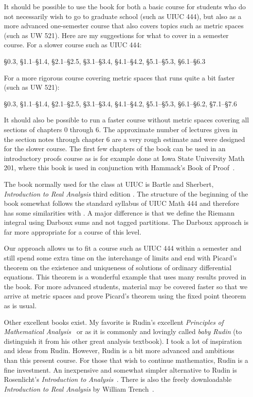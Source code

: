 \documentclass[12pt]{book}
\begin{document}
It should be possible to use the book for both a basic course for students who do not necessarily wish to go to graduate school (such as UIUC 444), but also as a more advanced one-semester course that also covers topics such as metric spaces (such as UW 521).
Here are my suggestions for what to cover in a semester course.
 For a slower course such as UIUC 444:
\begin{center}
\S0.3, \S1.1--\S1.4, \S2.1--\S2.5, \S3.1--\S3.4, \S4.1--\S4.2,
\S5.1--\S5.3, \S6.1--\S6.3
\end{center}
For a more rigorous course covering metric spaces that runs quite a bit faster (such as UW 521):
\begin{center}
\S0.3, \S1.1--\S1.4, \S2.1--\S2.5, \S3.1--\S3.4, \S4.1--\S4.2,
\S5.1--\S5.3, \S6.1--\S6.2, \S7.1--\S7.6
\end{center}
It should also be possible to run a faster course without metric spaces covering all sections of chapters 0 through 6.
 The approximate number of
lectures given in the section notes through chapter 6 are a very rough estimate and were designed for the slower course.
The first few chapters of the book can be used in an introductory proofs course as is for example done at Iowa State University Math 201, where  this book is used in conjunction with Hammack's Book of Proof~\cite{Hammack}.

The book normally used for the class at UIUC is Bartle and Sherbert,
\emph{Introduction to Real Analysis} third edition \cite{BS}.
The structure of the beginning of the book somewhat follows the standard syllabus of UIUC Math 444 and therefore has some similarities with \cite{BS}.
A major difference is that we define the Riemann integral using Darboux sums and not tagged partitions.
 The Darboux approach is far more appropriate for a course of this level.

Our approach allows us to fit a course such as UIUC 444 within a semester and still spend some extra time on the interchange of limits and end with Picard's theorem on the existence and uniqueness of solutions of ordinary differential equations.
This theorem is a wonderful example that uses many results proved in the book.
 For more advanced students,
material may be covered faster so that we arrive at metric spaces and prove Picard's theorem using the fixed point theorem as is usual.

Other excellent books exist.
 My favorite is  Rudin's excellent \emph{Principles of Mathematical Analysis}~\cite{Rudin:baby} or as it is commonly and lovingly called \emph{baby Rudin} (to distinguish it from his other great analysis textbook).  
 I took a lot of inspiration and ideas from Rudin.
 However, Rudin is a bit more advanced and ambitious than this present course.
For those that wish to continue mathematics, Rudin is a fine investment.
An inexpensive and somewhat simpler alternative to Rudin is Rosenlicht's \emph{Introduction to Analysis}~\cite{Rosenlicht}.
There is also the freely downloadable \emph{Introduction to Real Analysis} by William Trench~\cite{Trench}.
\end{document}
